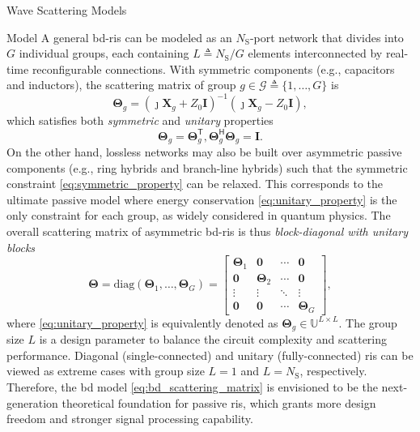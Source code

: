 \begin{section}{}
\begin{subsection}{Wave Scattering Models}
\begin{subsection}{ Model}
			A general \gls{bd}-\gls{ris} can be modeled as an $N_\mathrm{S}$-port network that divides into $G$ individual groups, each containing $L \triangleq N_\mathrm{S} / G$ elements interconnected by real-time reconfigurable connections.
			With symmetric components (e.g., capacitors and inductors), the scattering matrix of group $g \in \mathcal{G} \triangleq \{1, \ldots, G\}$ is \cite{Shen2020a}
			\begin{equation}
				\mathbf{\Theta}_g = (\jmath \mathbf{X}_g + Z_0 \mathbf{I})^{-1} (\jmath \mathbf{X}_g - Z_0 \mathbf{I}),
			\end{equation}
			which satisfies both \emph{symmetric} and \emph{unitary} properties
			\begin{subequations}
				\begin{equation}
					\mathbf{\Theta}_g = \mathbf{\Theta}_g^\mathsf{T},
					\label{eq:symmetric_property}
				\end{equation}
				\begin{equation}
					\mathbf{\Theta}_g^\mathsf{H} \mathbf{\Theta}_g = \mathbf{I}.
					\label{eq:unitary_property}
				\end{equation}
			\end{subequations}
			On the other hand, lossless networks may also be built over asymmetric passive components (e.g., ring hybrids and branch-line hybrids) \cite{Ahn2006} such that the symmetric constraint \eqref{eq:symmetric_property} can be relaxed.
			This corresponds to the ultimate passive model where energy conservation \eqref{eq:unitary_property} is the only constraint for each group, as widely considered in quantum physics.
			The overall scattering matrix of asymmetric \gls{bd}-\gls{ris} is thus \emph{block-diagonal with unitary blocks}
			\begin{equation}
				\mathbf{\Theta} = \mathrm{diag}(\mathbf{\Theta}_1,\ldots,\mathbf{\Theta}_G) =
				\begin{bmatrix}
					\mathbf{\Theta}_1 & \mathbf{0} & \cdots & \mathbf{0} \\
					\mathbf{0} & \mathbf{\Theta}_2 & \cdots & \mathbf{0} \\
					\vdots & \vdots & \ddots & \vdots \\
					\mathbf{0} & \mathbf{0} & \cdots & \mathbf{\Theta}_G
				\end{bmatrix},
				\label{eq:bd_scattering_matrix}
			\end{equation}
			where \eqref{eq:unitary_property} is equivalently denoted as $\mathbf{\Theta}_g \in \mathbb{U}^{L \times L}$.
			The group size $L$ is a design parameter to balance the circuit complexity and scattering performance.
			Diagonal (single-connected) and unitary (fully-connected) \gls{ris} can be viewed as extreme cases with group size $L=1$ and $L=N_\mathrm{S}$, respectively.
			Therefore, the \gls{bd} model \eqref{eq:bd_scattering_matrix} is envisioned to be the next-generation theoretical foundation for passive \gls{ris}, which grants more design freedom and stronger signal processing capability.


\end{subsection}
\end{subsection}
\end{section}
